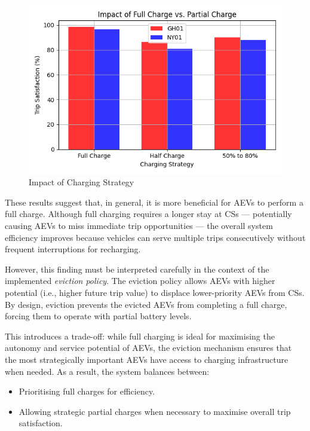 \begin{figure}[h]
  \vspace{-0.2cm}
  \centering
  \includegraphics[scale=0.40]{Crest/Images/batery_capacitty.png}
  \caption{Impact of Charging Strategy}
  \label{fig:battery}
  \vspace{-0.1cm}
\end{figure}

These results suggest that, in general, it is more beneficial for AEVs to perform a full charge. Although full charging requires a longer stay at CSs — potentially causing AEVs to miss immediate trip opportunities — the overall system efficiency improves because vehicles can serve multiple trips consecutively without frequent interruptions for recharging.

However, this finding must be interpreted carefully in the context of the implemented \textit{eviction policy}. The eviction policy allows AEVs with higher potential (i.e., higher future trip value) to displace lower-priority AEVs from CSs. By design, eviction prevents the evicted AEVs from completing a full charge, forcing them to operate with partial battery levels.

This introduces a trade-off: while full charging is ideal for maximising the autonomy and service potential of AEVs, the eviction mechanism ensures that the most strategically important AEVs have access to charging infrastructure when needed. As a result, the system balances between:
\begin{itemize}
    \item Prioritising full charges for efficiency.
    \item Allowing strategic partial charges when necessary to maximise overall trip satisfaction.
\end{itemize}

